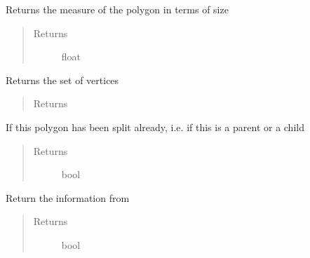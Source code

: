 \documentclass[letterpaper,10pt,english]{sphinxmanual}
\begin{document}
\begin{fulllineitems}
\begin{fulllineitems}
\end{fulllineitems}



\begin{fulllineitems}
Returns the measure of the polygon in terms of size
\begin{quote}\begin{description}
\item[{Returns}] \leavevmode
float

\end{description}\end{quote}

\end{fulllineitems}



\begin{fulllineitems}
Returns the set of vertices
\begin{quote}\begin{description}
\item[{Returns}] \leavevmode
\href{http://docs.scipy.org/doc/numpy/reference/generated/numpy.ndarray.html\#numpy.ndarray}{}

\end{description}\end{quote}

\end{fulllineitems}



\begin{fulllineitems}
If this polygon has been split already, i.e. if this is 
a parent or a child
\begin{quote}\begin{description}
\item[{Returns}] \leavevmode
bool

\end{description}\end{quote}

\end{fulllineitems}



\begin{fulllineitems}
Return the information from 
\begin{quote}\begin{description}
\item[{Returns}] \leavevmode
bool


\end{description}
\end{quote}
\end{fulllineitems}
\end{fulllineitems}
\end{document}
